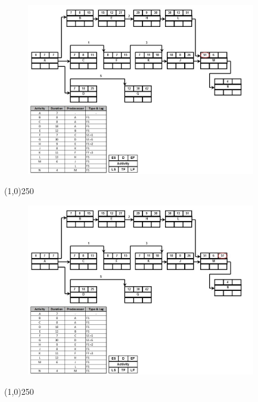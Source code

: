 \begin{frame}
\begin{figure}
	\centering
		\includegraphics[width = 10.0cm]{oldnotes/Slide214.jpg}
\end{figure}
\end{frame}
\begin{center}\line(1,0){250}\end{center}




\begin{frame}
\begin{figure}
	\centering
		\includegraphics[width = 10.0cm]{oldnotes/Slide215.jpg}
\end{figure}
\end{frame}
\begin{center}\line(1,0){250}\end{center}




